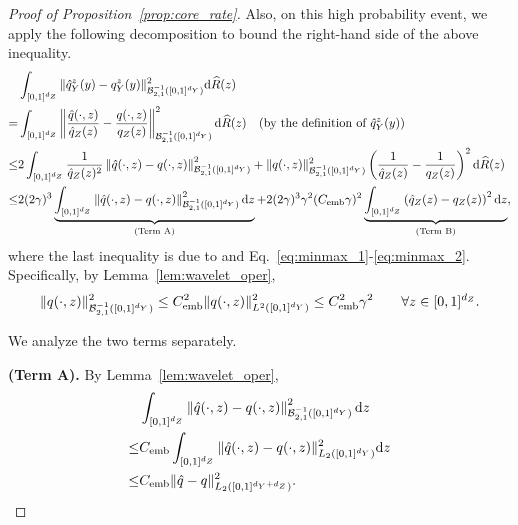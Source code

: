 \documentclass{article}
\theoremstyle{plain}
\newtheorem{proposition}{Proposition}[section]
\theoremstyle{definition}
\def\EE{\mathbb{E}}
\def\calB{\mathcal{B}}
\theoremstyle{plain}
\newcommand{\diff}{{\rm d}}
\def\EE{\mathbb{E}}
\def\calB{\mathcal{B}}
\begin{document}
\begin{proof}[Proof of Proposition~\ref{prop:core_rate}]
    Also, on this high probability event, we apply the following decomposition to bound the right-hand side of the above inequality.    
    \begin{align*}
    &\int_{[0,1]^{d_Z}} \|\hat q_Y^z(y) - q_Y^z(y)\|^2_{\calB_{2,1}^{-1}([0,1]^{d_Y})} \diff \widehat R(z)\\
    = & \int_{[0,1]^{d_Z}} \left\|\frac{\hat q(\cdot, z)}{\hat q_Z(z)} - \frac{q(\cdot, z)}{q_Z(z)}\right\|^2_{\calB_{2,1}^{-1}([0,1]^{d_Y})} \diff \widehat R(z) \quad (\text{by the definition of}~\hat q_Y^z(y))\\
    \leq & 2 \int_{[0,1]^{d_Z}} \frac{1}{\hat q_Z(z)^2} \left\|\hat q(\cdot, z) - q(\cdot, z)\right\|^2_{\calB_{2,1}^{-1}([0,1]^{d_Y})} + \|q(\cdot, z)\|^2_{\calB_{2,1}^{-1}([0,1]^{d_Y})} \left(\frac{1}{\hat q_Z(z)} - \frac{1}{q_Z(z)}\right)^2  \diff \widehat R(z)\\
    \leq & 2 (2\gamma)^3  \underbrace{\int_{[0,1]^{d_Z}} \left\|\hat q(\cdot, z) - q(\cdot, z)\right\|^2_{\calB_{2,1}^{-1}([0,1]^{d_Y})}  \diff z}_{\text{(Term A)}} +  2 (2\gamma)^3 \gamma^2 (C_{\textup{emb}} \gamma)^2\underbrace{  \int_{[0,1]^{d_Z}}  \left(\hat q_Z(z) - q_Z(z)\right)^2  \diff z}_{\text{(Term B)}},
    \end{align*}
    where the last inequality is due to  and Eq.~\eqref{eq:minmax_1}-\eqref{eq:minmax_2}. Specifically, by Lemma~\ref{lem:wavelet_oper}, 
    \[
        \|q(\cdot, z)\|^2_{\calB_{2,1}^{-1}([0,1]^{d_Y})} \leq C_{\textup{emb}}^2 \|q(\cdot, z)\|^2_{L^2([0,1]^{d_Y})} \leq C_{\textup{emb}}^2 \gamma^2 \qquad \forall z \in [0,1]^{d_Z}.
    \]

    We analyze the two terms separately.

    \medskip
    \noindent
    \textbf{(Term A).}
    By Lemma~\ref{lem:wavelet_oper}, 
    \begin{align*}
        &\int_{[0,1]^{d_Z}} \left\|\hat q(\cdot, z) - q(\cdot, z)\right\|^2_{\calB_{2,1}^{-1}([0,1]^{d_Y})} \diff z \\
        \leq& C_{\textup{emb}}\int_{[0,1]^{d_Z}} \|\hat q(\cdot, z) - q(\cdot, z)\|^2_{L_2([0,1]^{d_Y})} \diff z\\
        \leq & C_{\textup{emb}} \|\hat q - q\|^2_{L_2([0,1]^{d_Y + d_Z})}.
    \end{align*}
    
    
    

\end{proof}
\end{document}
